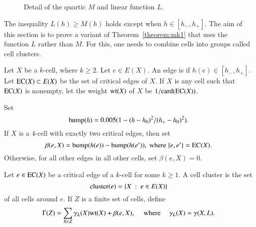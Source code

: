 \begin{figure}[htb]
  \centering
  \caption{Detail of the quartic $M$ and linear function $L$.}
  \label{fig:L}
\end{figure}

The inequality $L(h)\ge M(h)$ holds except when $h\in [h_-,h_+]$.  The aim of this section is to prove a variant of Theorem~\ref{theorem:mk1} that uses the function $L$ rather than $M$.  For this, one needs to combine cells into groups called cell clusters.

\begin{definition}\label{def:wt}
Let $X$ be a $k$-cell, where $k\ge 2$.  Let $e\in E(X)$.
An edge is  if $h(e)\in[h_-,h_+]$.
Let ${\operatorname{EC}}(X)\subset E(X)$ be the set of critical edges of $X$.  If $X$ is any cell such that ${\operatorname{EC}}(X)$ is nonempty, let the weight ${\operatorname{wt}}(X)$ of $X$  
be $1/{\operatorname{card}}({\operatorname{EC}}(X))$.
\end{definition}
%
%
%

\begin{definition} \label{def:beta}
 Set 
\begin{displaymath}
{\operatorname{bump}}(h) = 0.005 (1 - (h-h_0)^2/(h_+-h_0)^2).
\end{displaymath}
If $X$ is a $4$-cell with exactly two critical edges, then set
\begin{displaymath}
\beta(e,X) = {\operatorname{bump}}(h(e)) - {\operatorname{bump}}(h(e')), \text{ where } \{e,e'\} = {\operatorname{EC}}(X).  
\end{displaymath}
Otherwise, for all other edges in all other cells, set $\beta(e,X) = 0$.
\end{definition}
%
%

\begin{definition}\label{def:gammaL}
Let $e\in {\operatorname{EC}}(X)$ be a critical edge of a $k$-cell for some $k\ge 1$.
A cell cluster is the set 
\begin{displaymath}
{\operatorname{cluster}}(e) = \{X\ :\  e\in E(X)\} 
\end{displaymath}
%
of all cells around $e$. 
If $Z$ is a finite set of cells, define
%
\begin{displaymath}
\Gamma(Z) = \sum_{X\in Z} \gamma_L(X) {\operatorname{wt}}(X) +\beta(e,X),\quad\hbox{ where }\quad
\gamma_L(X) = \gamma(X,L).
\end{displaymath}
%
%

\end{definition}
%

